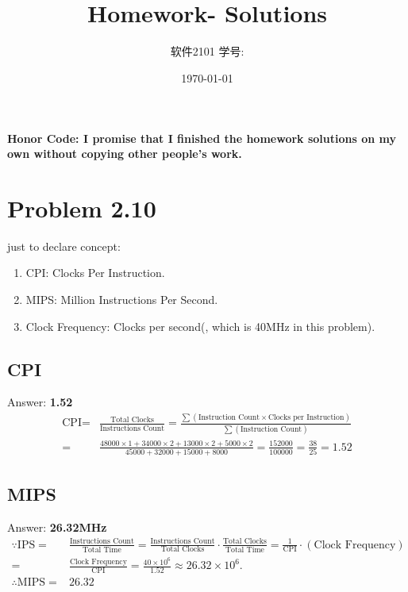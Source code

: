 \documentclass[11pt]{article}  %
\title{\vspace{-4cm}\CourseCodeName \space
        \Session \protect\\  Homework-\textbf{\Homework} Solutions}
\author{软件2101 \Name \space 学号: \SID}
\date{\today}
\begin{document}
\maketitle

\textbf{Honor Code: I promise that I finished the homework solutions on my own without copying other people's 
    work.}

\section*{Problem 2.10}

just to declare concept: 
\begin{enumerate}
    \item CPI: Clocks Per Instruction.
    \item MIPS: Million Instructions Per Second.
    \item Clock Frequency: Clocks per second(, which is 40MHz in this problem).
    \end{enumerate}

\subsection*{CPI}
    Answer: \textbf{1.52} 
    $$
    \begin{aligned}
        \text{CPI} = &\frac{\text{Total Clocks}}{\text{Instructions Count}} = 
            \frac{\sum\left(\text{Instruction Count} \times \text{Clocks per Instruction}\right)}
            {\sum\left(\text{Instruction Count}\right)}\\
        = & \frac{48000\times 1+34000 \times 2+13000\times 2+ 5000\times 2}{45000+32000+15000+8000} = 
            \frac{152000}{100000} = \frac{38}{25} = 1.52
    \end{aligned}
    $$

\subsection*{MIPS}
    Answer: \textbf{26.32MHz}
    $$
    \begin{aligned}
        \because \text{IPS} =& \frac{\text{Instructions Count}}{\text{Total Time}} = 
            \frac{\text{Instructions Count}}{\text{Total Clocks}}\cdot\frac{\text{Total Clocks}}
            {\text{Total Time}} = \frac{1}{\text{CPI}}\cdot \left(\text{Clock Frequency}\right)\\
        =&\frac{\text{Clock Frequency}}{\text{CPI}} = 
            \frac{40\times 10^6}{1.52} \approx 26.32 \times 10^6. \\
        \therefore \text{MIPS} =& 26.32
    \end{aligned}
    $$
\end{document}

